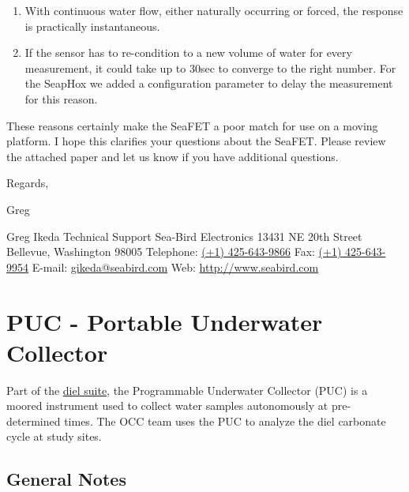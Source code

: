 \documentclass[]{book}
\begin{document}
\begin{enumerate}
\def\labelenumi{\alph{enumi})}
\item
  With continuous water flow, either naturally occurring or forced, the response is practically instantaneous.
\item
  If the sensor has to re-condition to a new volume of water for every measurement, it could take up to 30sec to converge to the right number. For the SeapHox we added a configuration parameter to delay the measurement for this reason.
\end{enumerate}

These reasons certainly make the SeaFET a poor match for use on a moving platform. I hope this clarifies your questions about the SeaFET. Please review the attached paper and let us know if you have additional questions.

Regards,

Greg

Greg Ikeda
Technical Support
Sea-Bird Electronics
13431 NE 20th Street
Bellevue, Washington 98005
Telephone: \href{nulltel:\%28\%2B1\%29\%20425-643-9866}{(+1) 425-643-9866}
Fax: \href{nulltel:\%28\%2B1\%29\%20425-643-9954}{(+1) 425-643-9954}
E-mail: \href{nullmailto:gikeda@seabird.com}{gikeda@seabird.com}
Web: \href{http://www.seabird.com/}{http://www.seabird.com}

\hypertarget{puc}{%
\chapter{PUC - Portable Underwater Collector}\label{puc}}

Part of the \protect\hyperlink{dielsuite}{diel suite}, the Programmable Underwater Collector (PUC) is a moored instrument used to collect water samples autonomously at pre-determined times. The OCC team uses the PUC to analyze the diel carbonate cycle at study sites.

\hypertarget{general-notes}{%
\section{General Notes}\label{general-notes}}
\end{document}
